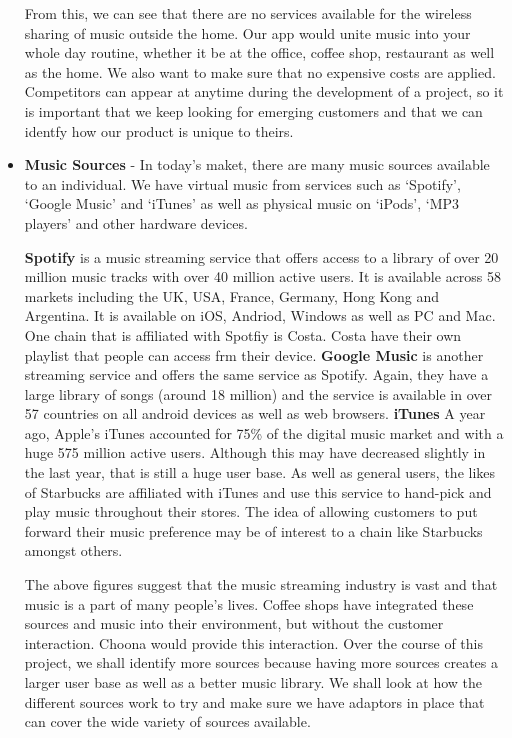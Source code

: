 \begin{itemize}
    From this, we can see that there are no services available for the wireless sharing of music outside the home. Our app would unite music into your whole day routine, whether it be at the office, coffee shop, restaurant as well as the home. We also want to make sure that no expensive costs are applied.
    Competitors can appear at anytime during the development of a project, so it is important that we keep looking for emerging customers and that we can identfy how our product is unique to theirs. 

  \item \textbf{Music Sources} -
    In today's maket, there are many music sources available to an individual. We have virtual music from services such as `Spotify', `Google Music' and `iTunes' as well as physical music on `iPods', `MP3 players' and other hardware devices. 

    \textbf{Spotify} is a music streaming service that offers access to a library of over 20 million music tracks with over 40 million active users. It is available across 58 markets including the UK, USA, France, Germany, Hong Kong and Argentina. It is available on iOS, Andriod, Windows as well as PC and Mac. One chain that is affiliated with Spotfiy is Costa. Costa have their own playlist that people can access frm their device. 
    \textbf{Google Music} is another streaming service and offers the same service as Spotify. Again, they have a large library of songs (around 18 million) and the service is available in over 57 countries on all android devices as well as web browsers. 
    \textbf{iTunes} A year ago, Apple's iTunes accounted for 75\% of the digital music market and with a huge 575 million active users. Although this may have decreased slightly in the last year, that is still a huge user base. As well as general users, the likes of Starbucks are affiliated with iTunes and use this service to hand-pick and play music throughout their stores. The idea of allowing customers to put forward their music preference may be of interest to a chain like Starbucks amongst others. 

    The above figures suggest that the music streaming industry is vast and that music is a part of many people's lives. Coffee shops have integrated these sources and music into their environment, but without the customer interaction. Choona would provide this interaction. Over the course of this project, we shall identify more sources because having more sources creates a larger user base as well as a better music library. We shall look at how the different sources work to try and make sure we have adaptors in place that can cover the wide variety of sources available. 


\end{itemize}
